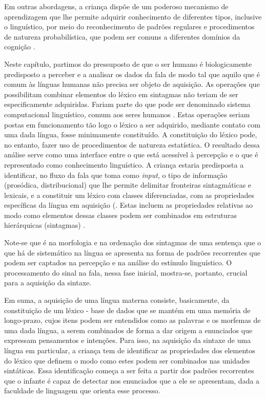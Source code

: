 \documentclass[output=paper]{LSP/langsci}
\begin{document}
Em outras abordagens, a criança dispõe de um poderoso mecanismo de aprendizagem que lhe permite adquirir conhecimento de diferentes tipos, inclusive o linguístico, por meio do reconhecimento de padrões regulares e procedimentos de natureza probabilística, que podem ser comuns a diferentes domínios da cognição \citep{kuhl2010}.

Neste capítulo, partimos do pressuposto de que o ser humano é biologicamente predisposto a perceber e a analisar os dados da fala de modo tal que aquilo que é comum às línguas humanas não precisa ser objeto de aquisição. As operações que possibilitam combinar elementos do léxico em sintagmas não teriam de ser especificamente adquiridas. Fariam parte do que pode ser denominado sistema computacional linguístico, comum aos seres humanos \citep{chomsky2005}. Estas operações seriam postas em funcionamento tão logo o léxico a ser adquirido, mediante contato com uma dada língua, fosse minimamente constituído. A constituição do léxico pode, no entanto, fazer uso de procedimentos de natureza estatística. O resultado dessa análise serve como uma interface entre o que está acessível à percepção e o que é representado como conhecimento linguístico. A criança estaria predisposta a identificar, no fluxo da fala que toma como \textit{input}, o tipo de informação (prosódica, distribucional) que lhe permite delimitar fronteiras sintagmáticas e lexicais, e a constituir um léxico com classes diferenciadas, com as propriedades específicas da língua em aquisição (\citep{morgandemuth1996}. Estas incluem as propriedades relativas ao modo como elementos dessas classes podem ser combinados em estruturas hierárquicas (sintagmas) \citep{correa2014}. 

Note-se que é na morfologia e na ordenação dos sintagmas de uma sentença que o que há de sistemático na língua se apresenta na forma de padrões recorrentes que podem ser captados na percepção e na análise do estímulo linguístico. O processamento do sinal na fala, nessa fase inicial, mostra-se, portanto, crucial para a aquisição da sintaxe. 

Em suma, a aquisição de uma língua materna consiste, basicamente, da constituição de um léxico - base de dados que se mantém em uma memória de longo-prazo, cujos itens podem ser entendidos como as palavras e os morfemas de uma dada língua, a serem combinados de forma a dar origem a enunciados que expressam pensamentos e intenções. Para isso, na aquisição da sintaxe de uma língua em particular, a criança tem de identificar as propriedades dos elementos do léxico que definem o modo como estes podem ser combinados nas unidades sintáticas. Essa identificação começa a ser feita a partir dos padrões recorrentes que o infante é capaz de detectar nos enunciados que a ele se apresentam, dada a faculdade de linguagem que orienta esse processo.  
\end{document}
